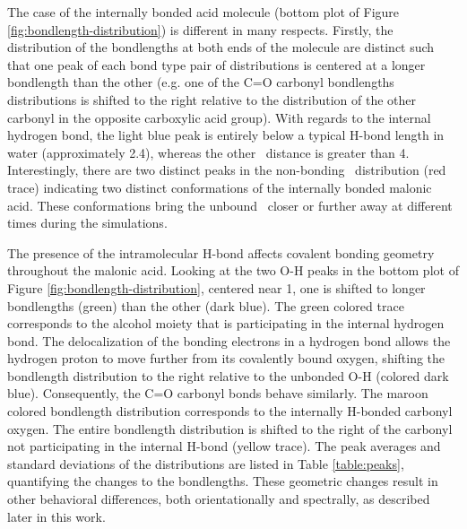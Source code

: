 The case of the internally bonded acid molecule (bottom plot of Figure \ref{fig:bondlength-distribution}) is different in many respects. Firstly, the distribution of the bondlengths at both ends of the molecule are distinct such that one peak of each bond type pair of distributions is centered at a longer bondlength than the other (e.g. one of the C=O carbonyl bondlengths distributions is shifted to the right relative to the distribution of the other carbonyl in the opposite carboxylic acid group). With regards to the internal hydrogen bond, the light blue peak is entirely below a typical H-bond length in water (approximately 2.4\angs), whereas the other \ocarbh~distance is greater than 4\angs. Interestingly, there are two distinct peaks in the non-bonding \ocarbh~distribution (red trace) indicating two distinct conformations of the internally bonded malonic acid. These conformations bring the unbound \ocarbh~closer or further away at different times during the simulations.

The presence of the intramolecular H-bond affects covalent bonding geometry throughout the malonic acid. Looking at the two O-H peaks in the bottom plot of Figure \ref{fig:bondlength-distribution}, centered near 1\angs, one is shifted to longer bondlengths (green) than the other (dark blue). The green colored trace corresponds to the alcohol moiety that is participating in the internal hydrogen bond. The delocalization of the bonding electrons in a hydrogen bond allows the hydrogen proton to move further from its covalently bound oxygen, shifting the bondlength distribution to the right relative to the unbonded O-H (colored dark blue). Consequently, the C=O carbonyl bonds behave similarly. The maroon colored bondlength distribution corresponds to the internally H-bonded carbonyl oxygen. The entire bondlength distribution is shifted to the right of the carbonyl not participating in the internal H-bond (yellow trace). The peak averages and standard deviations of the distributions are listed in Table \ref{table:peaks}, quantifying the changes to the bondlengths. These geometric changes result in other behavioral differences, both orientationally and spectrally, as described later in this work.

